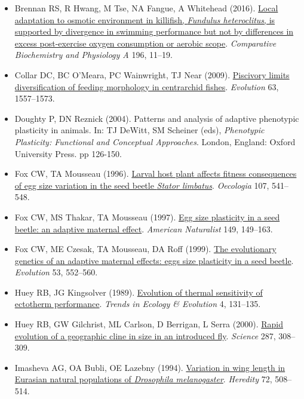 \documentclass[
]{book}
\begin{document}
\begin{itemize}
\item
  Brennan RS, R Hwang, M Tse, NA Fangue, A Whitehead (2016). \href{https://www.sciencedirect.com/science/article/pii/S1095643316300356}{Local adaptation to osmotic environment in killifish, \emph{Fundulus heteroclitus}, is supported by divergence in swimming performance but not by differences in excess post-exercise oxygen consumption or aerobic scope}. \emph{Comparative Biochemistry and Physiology A} 196, 11--19.
\item
  Collar DC, BC O'Meara, PC Wainwright, TJ Near (2009). \href{https://onlinelibrary.wiley.com/doi/10.1111/j.1558-5646.2009.00626.x}{Piscivory limits diversification of feeding morphology in centrarchid fishes}. \emph{Evolution} 63, 1557--1573.
\item
  Doughty P, DN Reznick (2004). Patterns and analysis of adaptive phenotypic plasticity in animals. In: TJ DeWitt, SM Scheiner (eds), \emph{Phenotypic Plasticity: Functional and Conceptual Approaches}. London, England: Oxford University Press. pp 126-150.
\item
  Fox CW, TA Mousseau (1996). \href{https://link.springer.com/article/10.1007\%2FBF00333946}{Larval host plant affects fitness consequences of egg size variation in the seed beetle \emph{Stator limbatus}}. \emph{Oecologia} 107, 541--548.
\item
  Fox CW, MS Thakar, TA Mousseau (1997). \href{https://www.journals.uchicago.edu/doi/abs/10.1086/285983}{Egg size plasticity in a seed beetle: an adaptive maternal effect}. \emph{American Naturalist} 149, 149--163.
\item
  Fox CW, ME Czesak, TA Mousseau, DA Roff (1999). \href{https://onlinelibrary.wiley.com/doi/10.1111/j.1558-5646.1999.tb03790.x}{The evolutionary genetics of an adaptive maternal effects: eggs size plasticity in a seed beetle}. \emph{Evolution} 53, 552--560.
\item
  Huey RB, JG Kingsolver (1989). \href{https://www.sciencedirect.com/science/article/abs/pii/0169534789902115}{Evolution of thermal sensitivity of ectotherm performance}. \emph{Trends in Ecology \& Evolution} 4, 131--135.
\item
  Huey RB, GW Gilchrist, ML Carlson, D Berrigan, L Serra (2000). \href{https://science.sciencemag.org/content/287/5451/308}{Rapid evolution of a geographic cline in size in an introduced fly}. \emph{Science} 287, 308--309.
\item
  Imasheva AG, OA Bubli, OE Lazebny (1994). \href{https://www.nature.com/articles/hdy199468}{Variation in wing length in Eurasian natural populations of \emph{Drosophila melanogaster}}. \emph{Heredity} 72, 508--514.

\end{itemize}
\end{document}
